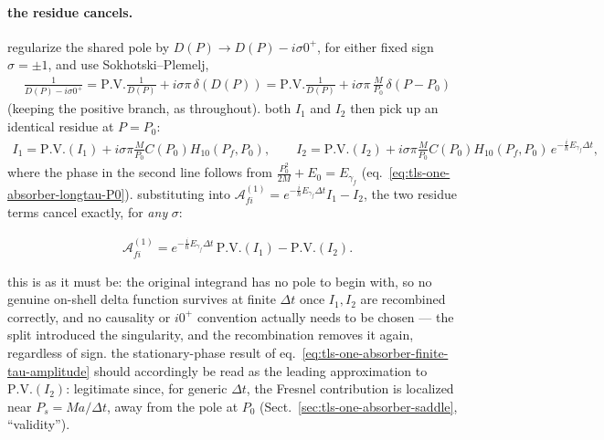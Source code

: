 \paragraph{the residue cancels.} regularize the shared pole by $D(P)\to D(P)-i\sigma0^+$, for either fixed sign $\sigma=\pm1$, and use Sokhotski--Plemelj,
\begin{align}
    \frac{1}{D(P)-i\sigma0^+} = \text{P.V.}\frac1{D(P)} + i\sigma\pi\,\delta(D(P)) = \text{P.V.}\frac1{D(P)} + i\sigma\pi\,\frac{M}{P_0}\,\delta(P-P_0)
\end{align}
(keeping the positive branch, as throughout). both $I_1$ and $I_2$ then pick up an identical residue at $P=P_0$:
\begin{align}
    I_1 = \text{P.V.}(I_1) + i\sigma\pi\frac{M}{P_0}C(P_0)H_{10}(P_f,P_0),\qquad
    I_2 = \text{P.V.}(I_2) + i\sigma\pi\frac{M}{P_0}C(P_0)H_{10}(P_f,P_0)\,e^{-\frac{i}{\hbar}E_{\gamma_f}\Delta t},
\end{align}
where the phase in the second line follows from $\frac{P_0^2}{2M}+E_0=E_{\gamma_f}$ (eq.~\eqref{eq:tls-one-absorber-longtau-P0}). substituting into $\mathcal A_{fi}^{(1)}=e^{-\frac{i}{\hbar}E_{\gamma_f}\Delta t}I_1-I_2$, the two residue terms cancel exactly, for {\it any} $\sigma$:
\begin{importantbox}
    \begin{align}
        \mathcal A_{fi}^{(1)} = e^{-\frac{i}{\hbar}E_{\gamma_f}\Delta t}\,\text{P.V.}(I_1) - \text{P.V.}(I_2).\label{eq:tls-one-absorber-finite-tau-total}
    \end{align}
\end{importantbox}
this is as it must be: the original integrand has no pole to begin with, so no genuine on-shell delta function survives at finite $\Delta t$ once $I_1,I_2$ are recombined correctly, and no causality or $i0^+$ convention actually needs to be chosen --- the split introduced the singularity, and the recombination removes it again, regardless of sign. the stationary-phase result of eq.~\eqref{eq:tls-one-absorber-finite-tau-amplitude} should accordingly be read as the leading approximation to $\text{P.V.}(I_2)$: legitimate since, for generic $\Delta t$, the Fresnel contribution is localized near $P_s=Ma/\Delta t$, away from the pole at $P_0$ (Sect.~\ref{sec:tls-one-absorber-saddle}, ``validity'').

